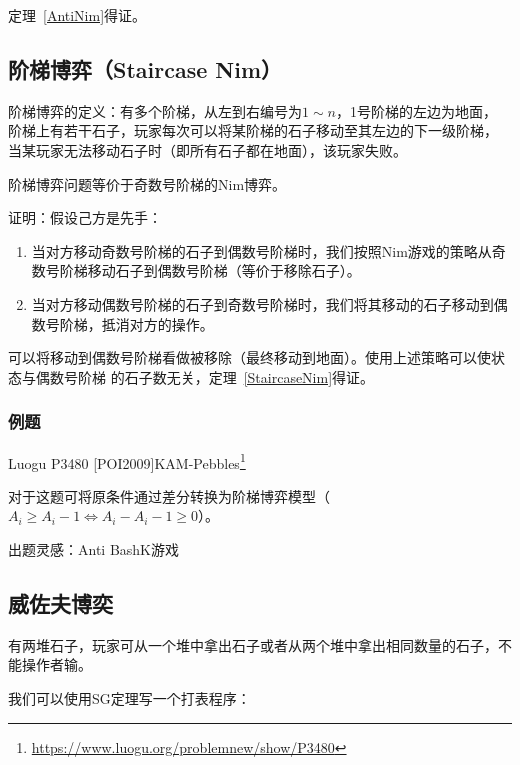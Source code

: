 定理~\ref{AntiNim}得证。

\subsection{阶梯博弈（Staircase Nim）}
阶梯博弈的定义：有多个阶梯，从左到右编号为$1\sim n$，1号阶梯的左边为地面，
阶梯上有若干石子，玩家每次可以将某阶梯的石子移动至其左边的下一级阶梯，
当某玩家无法移动石子时（即所有石子都在地面），该玩家失败。

\begin{theorem}\label{StaircaseNim}
	阶梯博弈问题等价于奇数号阶梯的Nim博弈。
\end{theorem}

证明：假设己方是先手：

\begin{enumerate}
	\item 当对方移动奇数号阶梯的石子到偶数号阶梯时，我们按照Nim游戏的策略从奇
	      数号阶梯移动石子到偶数号阶梯（等价于移除石子）。
	\item 当对方移动偶数号阶梯的石子到奇数号阶梯时，我们将其移动的石子移动到偶
	      数号阶梯，抵消对方的操作。
\end{enumerate}

可以将移动到偶数号阶梯看做被移除（最终移动到地面）。使用上述策略可以使状态与偶数号阶梯
的石子数无关，定理~\ref{StaircaseNim}得证。

\subsubsection{例题}

Luogu P3480 [POI2009]KAM-Pebbles\footnote{
	\url{https://www.luogu.org/problemnew/show/P3480}
}

对于这题可将原条件通过差分转换为阶梯博弈模型（$A_i \geq A_i-1 \Leftrightarrow
	A_i-A_i-1 \geq 0$）。



出题灵感：Anti BashK游戏

\subsection{威佐夫博奕}
有两堆石子，玩家可从一个堆中拿出石子或者从两个堆中拿出相同数量的石子，不能操作者输。

我们可以使用SG定理写一个打表程序：


